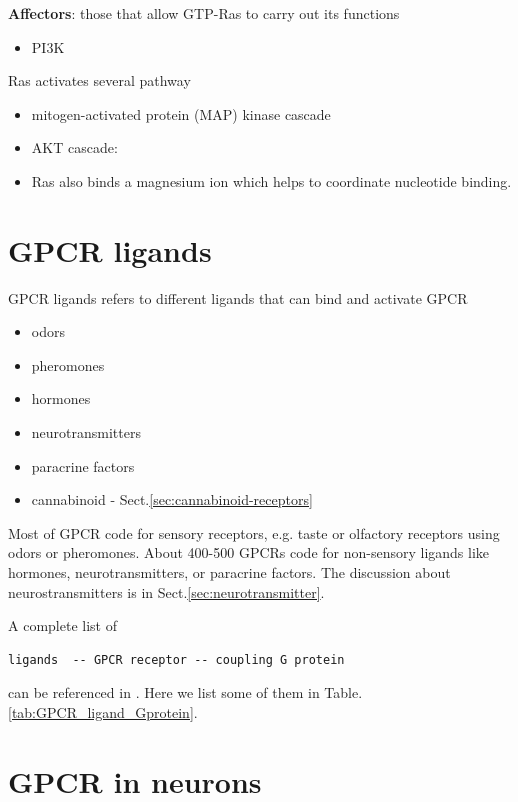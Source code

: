 {\bf Affectors}: those that allow GTP-Ras to carry out its functions
\begin{itemize}
  \item PI3K
\end{itemize}

Ras activates several pathway
\begin{itemize}
  \item  mitogen-activated protein (MAP) kinase cascade
  
  \item AKT cascade: 
  
  \item Ras also binds a magnesium ion which helps to coordinate nucleotide binding.
  
\end{itemize}

\section{GPCR ligands}
\label{sec:GPCR_ligands}

GPCR ligands refers to different ligands that can bind and activate GPCR
\begin{itemize}
  \item odors
  \item pheromones
  \item hormones 
  \item neurotransmitters 
  \item paracrine factors
  \item cannabinoid - Sect.\ref{sec:cannabinoid-receptors}
\end{itemize} 

Most of GPCR code for sensory receptors, e.g. taste or olfactory receptors using
odors or pheromones. About 400-500 GPCRs code for non-sensory ligands like
hormones, neurotransmitters, or paracrine factors. The discussion about
neurostransmitters is in Sect.\ref{sec:neurotransmitter}.

A complete list of
\begin{verbatim}
ligands  -- GPCR receptor -- coupling G protein
\end{verbatim}
can be referenced in \citep{Wettschureck2005}.
Here we list some of them in Table.\ref{tab:GPCR_ligand_Gprotein}.


\section{GPCR in neurons}
\label{sec:GPCR-in-neurons}


